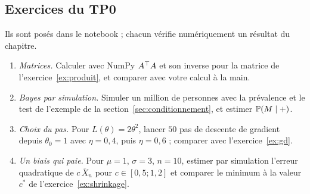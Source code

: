 \subsection*{Exercices du TP0}
Ils sont posés dans le notebook ; chacun vérifie numériquement un résultat du chapitre.
\begin{enumerate}
  \item \emph{Matrices.} Calculer avec NumPy $A\T A$ et son inverse pour la matrice de l'exercice~\ref{ex:produit}, et comparer avec votre calcul à la main.
  \item \emph{Bayes par simulation.} Simuler un million de personnes avec la prévalence et le test de l'exemple de la section~\ref{sec:conditionnement}, et estimer $\P(M\mid+)$.
  \item \emph{Choix du pas.} Pour $L(\theta)=2\theta^2$, lancer $50$ pas de descente de gradient depuis $\theta_0=1$ avec $\eta=0{,}4$, puis $\eta=0{,}6$ ; comparer avec l'exercice~\ref{ex:gd}.
  \item \emph{Un biais qui paie.} Pour $\mu=1$, $\sigma=3$, $n=10$, estimer par simulation l'erreur quadratique de $c\,\bar X_n$ pour $c\in[0{,}5;1{,}2]$ et comparer le minimum à la valeur $c^*$ de l'exercice~\ref{ex:shrinkage}.
\end{enumerate}
